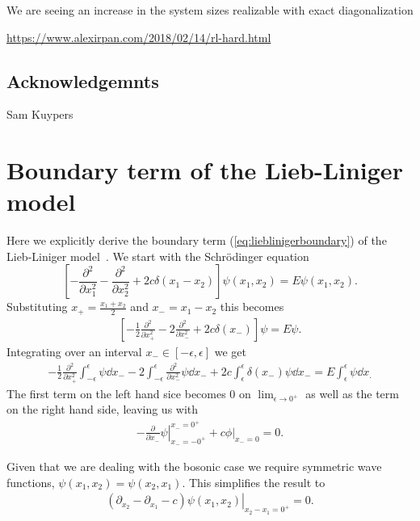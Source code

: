 \documentclass[11pt, a4paper]{report} %
\begin{document}
We are seeing an increase in the system sizes realizable with exact diagonalization \cite{wietek18_sublat_codin_algor_distr_memor}

\url{https://www.alexirpan.com/2018/02/14/rl-hard.html}

\section*{Acknowledgemnts}
Sam Kuypers

\appendix

\chapter{Boundary term of the Lieb-Liniger model}\label{cha:boundary}

Here we explicitly derive the boundary term (\cref{eq:lieblinigerboundary}) of the Lieb-Liniger model~\cite{Caux2015}.
We start with the Schrödinger equation
\begin{equation}
	\left[- \frac{\partial^2}{\partial x_1^2} - \frac{\partial^2}{\partial x_2^2} + 2c \delta(x_1 - x_2)\right] \psi(x_1, x_2) = E \psi(x_1,x_2).
\end{equation} 
Substituting \(x_+ = \frac{x_1+x_2}{2}\) and \(x_-=x_1-x_2\) this becomes
\begin{align}
  \label{eq:17}
  	\left[-\frac{1}{2}\frac{\partial^2}{\partial x_+^2} - 2\frac{\partial^2}{\partial x_-^2} + 2c \delta(x_-)\right] \psi = E\psi.
\end{align}
Integrating over an interval \(x_-\in[-\epsilon,\epsilon]\) we get
\begin{align}
  \label{eq:18}
  -\frac{1}{2} \frac{\partial^2}{\partial x_+^2} \int_{-\epsilon}^{\epsilon} \psi \dd x_- - 2 \int_{-\epsilon}^{\epsilon} \frac{\partial^2}{\partial x_-^2}\psi \dd x_- + 2c\int_{\epsilon}^{\epsilon} \delta(x_-)\psi \dd x_- = E\int_{\epsilon}^{\epsilon} \psi \dd x_.
\end{align}
The first term on the left hand sice becomes 0 on \(\lim_{\epsilon\to0^+}\) as well as the term on the right hand side, leaving us with
\begin{align}
  \label{eq:19}
  \left.- \frac{\partial}{\partial x_-} \psi \right|_{x_-=-0^+}^{x_-=0^+}  + \left.c\phi\right|_{x_-=0} = 0.
\end{align}

Given that we are dealing with the bosonic case we require symmetric wave functions, \(\psi(x_1,x_2)=\psi(x_2,x_1)\).
This simplifies the result to
\begin{align}
  \label{eq:20}
  \left.(\partial_{x_2} - \partial_{x_1} - c) \psi(x_1, x_2)\right|_{x_2-x_1=0^+} = 0.
\end{align}
\end{document}
